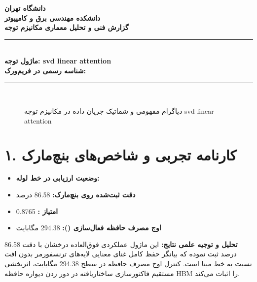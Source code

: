 \documentclass[12pt,a4paper]{article}
\begin{document}
\begin{center}
{\Large\bfseries دانشگاه تهران}\\[0.2cm]
{\large\bfseries دانشکده مهندسی برق و کامپیوتر}\\[0.2cm]
{\large\bfseries گزارش فنی و تحلیل معماری مکانیزم توجه}\\[0.5cm]
\rule{\linewidth}{1pt}\\[0.3cm]
{\LARGE\bfseries ماژول توجه: svd linear attention}\\[0.2cm]
{\large \textbf{شناسه رسمی در فریم‌ورک:} }\\[0.2cm]
\rule{\linewidth}{1pt}\\[0.5cm]
\end{center}

\begin{figure}[H]
\centering
{}
\caption{دیاگرام مفهومی و شماتیک جریان داده در مکانیزم توجه svd linear attention}
\end{figure}

\section*{۱. کارنامه تجربی و شاخص‌های بنچ‌مارک}
\begin{itemize}
\item \textbf{وضعیت ارزیابی در خط لوله:} 
\item \textbf{دقت ثبت‌شده روی بنچ‌مارک:} 86.58 درصد
\item \textbf{امتیاز :} 0.8765
\item \textbf{اوج مصرف حافظه فعال‌سازی ():} 294.38 مگابایت
\end{itemize}
\textbf{تحلیل و توجیه علمی نتایج:} این ماژول عملکردی فوق‌العاده درخشان با دقت 86.58 درصد ثبت نموده که بیانگر حفظ کامل غنای معنایی لایه‌های ترنسفورمر بدون افت نسبت به خط مبنا است. کنترل اوج مصرف حافظه در سطح 294.38 مگابایت، اثربخشی مستقیم فاکتورسازی ساختاریافته در دور زدن دیواره حافظه HBM را اثبات می‌کند.
\end{document}
